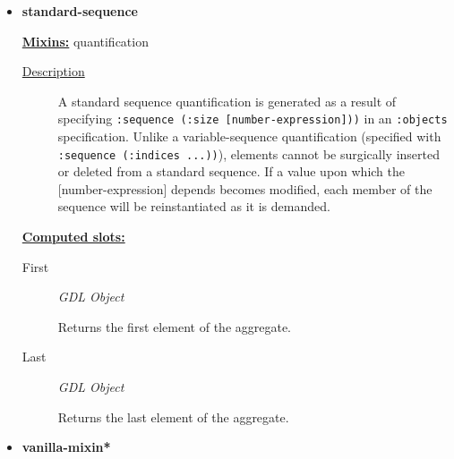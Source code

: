 \documentclass [11pt]{book}
\begin{document}
\begin{itemize}
\begin{description}
\end{description}









\item {}
\label{prim:standard-sequence}
\textbf{standard-sequence}


\textbf{
\underline{Mixins:}} quantification





\begin{description}

\item [
\underline{Description}]


A standard sequence quantification is generated as a result of specifying 
\texttt{:sequence (:size [number-expression]))} in an \texttt{:objects} specification. Unlike a variable-sequence 
quantification (specified with \texttt{:sequence (:indices ...))}), elements cannot be surgically inserted or 
deleted from a standard sequence. If a value upon which the [number-expression] depends becomes modified,
each member of the sequence will be reinstantiated as it is demanded.



\end{description}








\textbf{
\underline{Computed slots:}}

\begin{description}

\item [First]
\emph{GDL Object}

 Returns the first element of the aggregate.




\item [Last]
\emph{GDL Object}

 Returns the last element of the aggregate.




\end{description}







\item {}
\label{prim:vanilla-mixin*}
\textbf{vanilla-mixin*}



\end{itemize}
\end{document}
